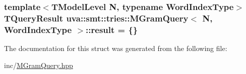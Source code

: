 \subsubsection[{result}]{\setlength{\rightskip}{0pt plus 5cm}template$<$T\+Model\+Level N, typename Word\+Index\+Type$>$ {\bf T\+Query\+Result} {\bf uva\+::smt\+::tries\+::\+M\+Gram\+Query}$<$ N, Word\+Index\+Type $>$\+::result = \{\}}\label{structuva_1_1smt_1_1tries_1_1_m_gram_query_af99d0de8ec2e4087a38a7a6b58b1f298}


The documentation for this struct was generated from the following file\+:\begin{DoxyCompactItemize}
\item 
inc/\hyperlink{_m_gram_query_8hpp}{M\+Gram\+Query.\+hpp}\end{DoxyCompactItemize}
